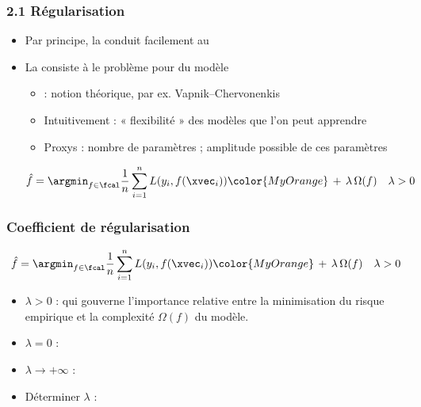 \begin{frame}
  \frametitle{2.1 Régularisation}
  \begin{itemize}
  \item Par principe, la  conduit facilement au 
  \item La  consiste à  le problème pour
     du modèle
    \begin{itemize}
    \item {} : notion théorique, par ex. Vapnik--Chervonenkis
    \item Intuitivement : « flexibilité » des modèles que l'on peut apprendre
    \item Proxys  : nombre de paramètres ; amplitude possible de ces paramètres
    \end{itemize}
    \[ \hat{f} = \argmin_{f \in \fcal} \frac1n \sum_{i=1}^n L(y_i, f(\xvec_i))
      {\color{MyOrange} \, + \, \lambda \, \Omega(f) } \hspace{1em} \lambda > 0
    \]
  \end{itemize}
\end{frame}

\begin{frame}
  \frametitle{Coefficient de régularisation}
    \[ \hat{f} = \argmin_{f \in \fcal} \frac1n \sum_{i=1}^n L(y_i, f(\xvec_i))
      {\color{MyOrange} \, + \, \lambda \, \Omega(f) } \hspace{1em} \lambda > 0
    \]
    \begin{itemize}
    \item {} $\lambda > 0$ :
     qui gouverne l'importance relative entre la
    minimisation du risque empirique et la complexité $\Omega(f)$ du modèle.
    \end{itemize}

    \begin{itemize}
    \item $\lambda = 0$ :
    \item $\lambda \to +\infty$ :
    \item Déterminer $\lambda$ :
    \end{itemize}
  \end{frame}

